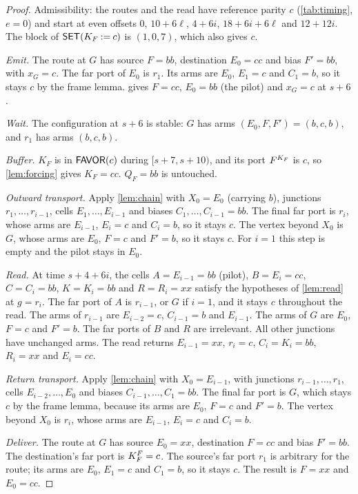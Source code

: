 \begin{proof}
Admissibility: the routes and the read have reference parity $c$ (\cref{tab:timing}, $e=0$) and
start at even offsets $0$, $10+6\ell$, $4+6i$, $18+6i+6\ell$ and $12+12i$. The block of
$\textsf{SET}(K_F\mathbin{:=}c)$ is $(1,0,7)$, which also gives $c$.

\emph{Emit.} The route at $G$ has source $F=bb$, destination $E_0=cc$ and bias $F'=bb$, with
$x_G=c$. The far port of $E_0$ is $r_1$. Its arms are $E_0$, $E_1=c$ and $C_1=b$, so it stays $c$ by
the frame lemma.  gives $F=cc$, $E_0=bb$ (the pilot) and $x_G=c$ at $s+6$.

\emph{Wait.} The configuration at $s+6$ is stable: $G$ has arms $(E_0,F,F')=(b,c,b)$, and $r_1$ has
arms $(b,c,b)$.

\emph{Buffer.} $K_F$ is in $\textsf{FAVOR}(c)$ during $[s+7,s+10)$, and its port $F^{K_F}$ is $c$, so
\cref{lem:forcing} gives $K_F=cc$. $Q_F=bb$ is untouched.

\emph{Outward transport.} Apply \cref{lem:chain} with $X_0=E_0$ (carrying $b$), junctions
$r_1,\dots,r_{i-1}$, cells $E_1,\dots,E_{i-1}$ and biases $C_1,\dots,C_{i-1}=bb$. The final far port is
$r_i$, whose arms are $E_{i-1}$, $E_i=c$ and $C_i=b$, so it stays $c$. The vertex beyond $X_0$ is $G$,
whose arms are $E_0$, $F=c$ and $F'=b$, so it stays $c$. For $i=1$ this step is empty and the pilot
stays in $E_0$.

\emph{Read.} At time $s+4+6i$, the cells $A=E_{i-1}=bb$ (pilot), $B=E_i=cc$, $C=C_i=bb$, $K=K_i=bb$
and $R=R_i=xx$ satisfy the hypotheses of \cref{lem:read} at $g=r_i$. The far port of $A$ is $r_{i-1}$,
or $G$ if $i=1$, and it stays $c$ throughout the read. The arms of $r_{i-1}$ are $E_{i-2}=c$,
$C_{i-1}=b$ and $E_{i-1}$. The arms of $G$ are $E_0$, $F=c$ and $F'=b$. The far ports of $B$ and $R$
are irrelevant. All other junctions have unchanged arms. The read returns $E_{i-1}=xx$, $r_i=c$,
$C_i=K_i=bb$, $R_i=xx$ and $E_i=cc$.

\emph{Return transport.} Apply \cref{lem:chain} with $X_0=E_{i-1}$, with junctions
$r_{i-1},\dots,r_1$, cells $E_{i-2},\dots,E_0$ and biases $C_{i-1},\dots,C_1=bb$. The final far port is $G$, which stays
$c$ by the frame lemma, because its arms are $E_0$, $F=c$ and $F'=b$. The vertex beyond $X_0$ is
$r_i$, whose arms are $E_{i-1}$, $E_i=c$ and $C_i=b$.

\emph{Deliver.} The route at $G$ has source $E_0=xx$, destination $F=cc$ and bias $F'=bb$. The
destination's far port is $K_F^{F}=c$. The source's far port $r_1$ is arbitrary for the route;
its arms are $E_0$, $E_1=c$ and $C_1=b$, so it stays $c$. The result is $F=xx$ and $E_0=cc$.
\end{proof}

